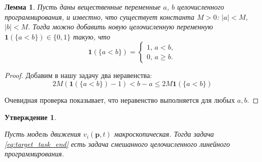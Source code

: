 \documentclass[12pt, a4paper]{article}
\newtheorem{state}{Утверждение}[section]
\newtheorem{lemma}{Лемма}[section]
\begin{document}
\begin{lemma}
	\label{lemma:lt}
	Пусть даны вещественные переменные $a$, $b$ целочисленного программирования, и известно, что существует константа $M > 0$: $|a| < M$, $|b| < M$. Тогда можно добавить новую целочисленную переменную $\textbf{1} (\{a < b\}) \in \{0, 1\}$ такую, что
	\begin{equation*}
		\textbf{1} (\{a < b\}) = 
		\begin{cases}
			1,\, a < b,
			\\
			0,\, a \ge b.
		\end{cases}
	\end{equation*}

\end{lemma}

\begin{proof}
	Добавим в нашу задачу два неравенства:
	$$ 2M (\textbf{1} (\{a < b\}) - 1) < b - a \le 2M\textbf{1} (\{a < b\}) $$
	
	Очевидная проверка показывает, что неравенство выполняется для любых $a, b$.
	
	
\end{proof}

\begin{state}
	
	\label{state:lin_prog}
	
	Пусть модель движения $ v_i(\textbf{p}, t)$ макроскопическая. Тогда задача \eqref{eq:target_task_end} есть задача смешанного целочисленного линейного программирования.
\end{state}
\end{document}
